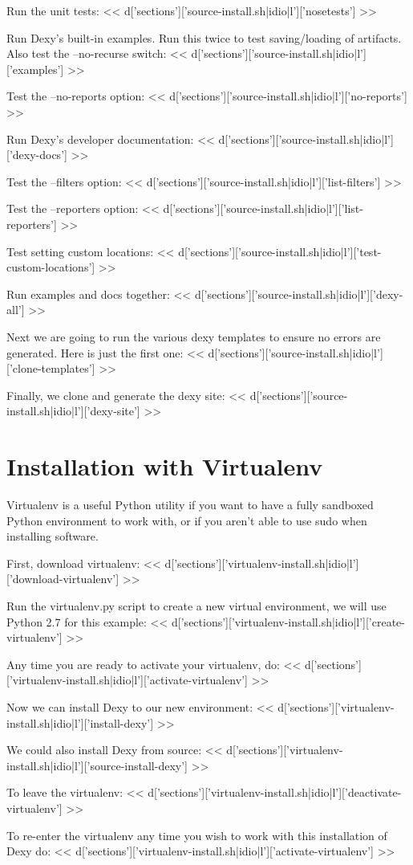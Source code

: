 \documentclass{tufte-handout}
\begin{document}
Run the unit tests:
<< d['sections']['source-install.sh|idio|l']['nosetests'] >>

Run Dexy's built-in examples. Run this twice to test saving/loading of artifacts. Also test the --no-recurse switch:
<< d['sections']['source-install.sh|idio|l']['examples'] >>

Test the --no-reports option:
<< d['sections']['source-install.sh|idio|l']['no-reports'] >>

Run Dexy's developer documentation:
<< d['sections']['source-install.sh|idio|l']['dexy-docs'] >>

Test the --filters option:
<< d['sections']['source-install.sh|idio|l']['list-filters'] >>

Test the --reporters option:
<< d['sections']['source-install.sh|idio|l']['list-reporters'] >>

Test setting custom locations:
<< d['sections']['source-install.sh|idio|l']['test-custom-locations'] >>

Run examples and docs together:
<< d['sections']['source-install.sh|idio|l']['dexy-all'] >>

Next we are going to run the various dexy templates to ensure no errors are generated. Here is just the first one:
<< d['sections']['source-install.sh|idio|l']['clone-templates'] >>

Finally, we clone and generate the dexy site:
<< d['sections']['source-install.sh|idio|l']['dexy-site'] >>

\section{Installation with Virtualenv}

Virtualenv is a useful Python utility if you want to have a fully sandboxed Python environment to work with, or if you aren't able to use sudo when installing software.

First, download virtualenv:
<< d['sections']['virtualenv-install.sh|idio|l']['download-virtualenv'] >>

Run the virtualenv.py script to create a new virtual environment, we will use Python 2.7 for this example:
<< d['sections']['virtualenv-install.sh|idio|l']['create-virtualenv'] >>

Any time you are ready to activate your virtualenv, do:
<< d['sections']['virtualenv-install.sh|idio|l']['activate-virtualenv'] >>

Now we can install Dexy to our new environment:
<< d['sections']['virtualenv-install.sh|idio|l']['install-dexy'] >>

We could also install Dexy from source:
<< d['sections']['virtualenv-install.sh|idio|l']['source-install-dexy'] >>

To leave the virtualenv:
<< d['sections']['virtualenv-install.sh|idio|l']['deactivate-virtualenv'] >>

To re-enter the virtualenv any time you wish to work with this installation of Dexy do:
<< d['sections']['virtualenv-install.sh|idio|l']['activate-virtualenv'] >>
\end{document}

